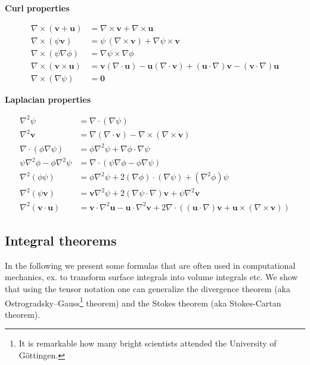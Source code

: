 \documentclass{digitaldynamics}
\begin{document}
\textbf{Curl properties}

\begin{align}
\nabla\times(\mathbf{v}+\mathbf{u}) &=\nabla\times\mathbf{v}+\nabla\times\mathbf{u} \\
\nabla\times\left(\psi\mathbf{v}\right) &=\psi\,(\nabla\times\mathbf{v})+\nabla\psi\times\mathbf{v} \\
\nabla\times\left(\psi\nabla\phi\right) &= \nabla \psi \times \nabla \phi \\
\nabla\times\left(\mathbf{v}\times\mathbf{u}\right) &= \mathbf{v}\left(\nabla\cdot\mathbf{u}\right)-\mathbf{u} \left( \nabla\cdot\mathbf{v}\right)+\left(\mathbf{u}\cdot\nabla\right)\mathbf{v}- \left(\mathbf{v}\cdot\nabla\right)\mathbf{u} \\
\nabla\times(\nabla\psi) &= \mathbf{0}
\end{align}

\textbf{Laplacian properties}

\begin{align}
\nabla^2\psi &= \nabla \cdot (\nabla\psi)\\ 
\nabla^2\mathbf{v} &= \nabla\left(\nabla \cdot \mathbf{v}\right) - \nabla \times \left(\nabla \times \mathbf{v}\right) \\
\nabla \cdot (\phi\nabla\psi) &= \phi\nabla^2\psi + \nabla\phi \cdot \nabla\psi \\
\psi\nabla^2\phi - \phi\nabla^2\psi &= \nabla \cdot \left(\psi\nabla\phi - \phi\nabla\psi\right) \\
\nabla^2(\phi\psi) &= \phi\nabla^2\psi + 2(\nabla\phi) \cdot(\nabla\psi) + \left(\nabla^2\phi\right)\psi \\
\nabla^2(\psi\mathbf{v}) &= \mathbf{v}\nabla^2\psi + 2(\nabla\psi \cdot \nabla)\mathbf{v} + \psi\nabla^2\mathbf{v} \\
\nabla^2(\mathbf{v} \cdot \mathbf{u}) &= \mathbf{v} \cdot \nabla^2\mathbf{u} - \mathbf{u} \cdot \nabla^2\!\mathbf{v} + 2\nabla \cdot ((\mathbf{u} \cdot \nabla)\mathbf{v} + \mathbf{u} \times (\nabla \times \mathbf{v})) 
\end{align}



\subsection{Integral theorems}

In the following we present some formulas that are often used in computational mechanics, ex. to transform surface integrals into volume integrals etc. 
We show that using the tensor notation one can generalize the divergence theorem (aka Ostrogradsky–Gauss\footnote{It is remarkable how many bright scientists attended the University of Göttingen.} theorem) and the Stokes theorem (aka Stokes-Cartan theorem).
\end{document}
